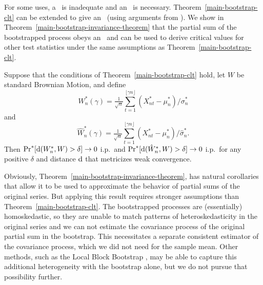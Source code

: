 \documentclass[11pt]{article}
\begin{document}
For some uses, a \clt\ is inadequate and an \fclt\ is necessary.
Theorem~\ref{main-bootstrap-clt} can be extended to give an \fclt\
(using arguments from \citealp{JoD:00b}). We show in
Theorem~\ref{main-bootstrap-invariance-theorem} that the partial sum
of the bootstrapped process obeys an \fclt\ and can be used to derive
critical values for other test statistics under the same assumptions
as Theorem~\ref{main-bootstrap-clt}.

\begin{thm}\label{main-bootstrap-invariance-theorem}
  Suppose that the conditions of Theorem~\ref{main-bootstrap-clt}
  hold, let $W$ be standard Brownian Motion, and define
  \begin{equation}
    \label{eq:6}
    W_n^{*}(\gamma) = \tfrac{1}{\sqrt{n}}
    \sum_{t=1}^{\lfloor \gamma n \rfloor} (X^*_{nt} - \mu_n^{*}) / \sigma_{n}^{*}
  \end{equation}
  and
  \begin{equation}
    \label{eq:7}
    \hat{W}_n^{*}(\gamma) = \tfrac{1}{\sqrt{n}}
    \sum_{t=1}^{\lfloor \gamma n \rfloor} (X^*_{nt} - \mu_n^{*}) / \hat\sigma_n^{*}.
  \end{equation}
  Then $\operatorname{Pr}^{*}[\operatorname{d}(W_n^{*}, W) > \delta] \to 0$ i.p.\ and
  $\operatorname{Pr}^{*}[\operatorname{d}(\hat{W}_n^{*}, W) > \delta] \to 0$ i.p.\ for any
  positive $\delta$ and distance $\operatorname{d}$ that metricizes weak
  convergence.
\end{thm}

Obviously, Theorem~\ref{main-bootstrap-invariance-theorem}, has
natural corollaries that allow it to be used to approximate the
behavior of partial sums of the original series.  But applying this
result requires stronger assumptions than
Theorem~\ref{main-bootstrap-clt}. The bootstrapped processes are
(essentially) homoskedastic, so they are unable to match patterns of
heteroskedasticity in the original series and we can not estimate the
covariance process of the original partial sum in the bootstrap. This
necessitates a separate consistent estimator of the covariance process, which
we did not need for the sample mean.  Other methods, such as the Local
Block Bootstrap \citep{PaP:02,DPP:03}, may be able to capture this
additional heterogeneity with the bootstrap alone, but we do not
pursue that possibility further.
\end{document}

